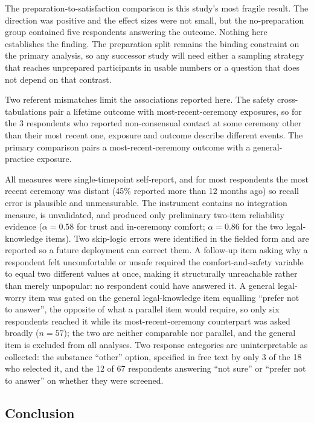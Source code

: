 \documentclass[12pt]{article}
\begin{document}
The preparation-to-satisfaction comparison is this study's most fragile result. The direction was positive
and the effect sizes were not small, but the no-preparation group contained five respondents answering the
outcome. Nothing here establishes the finding. The preparation split remains the binding constraint on the
primary analysis, so any successor study will need either a sampling strategy that reaches unprepared
participants in usable numbers or a question that does not depend on that contrast.

Two referent mismatches limit the associations reported here. The safety cross-tabulations pair a lifetime
outcome with most-recent-ceremony exposures, so for the 3 respondents who reported non-consensual contact at
some ceremony other than their most recent one, exposure and outcome describe different events. The primary
comparison pairs a most-recent-ceremony outcome with a general-practice exposure.

All measures were single-timepoint self-report, and for most respondents the most recent ceremony was
distant (45\% reported more than 12 months ago) so recall error is plausible and unmeasurable. The
instrument contains no integration measure, is unvalidated, and produced only preliminary two-item
reliability evidence ($\alpha=0.58$ for trust and in-ceremony comfort; $\alpha=0.86$ for the two
legal-knowledge items). Two skip-logic errors were identified in the fielded form and are reported so a
future deployment can correct them. A follow-up item asking why a respondent felt uncomfortable or unsafe
required the comfort-and-safety variable to equal two different values at once, making it structurally
unreachable rather than merely unpopular: no respondent could have answered it. A general legal-worry item
was gated on the general legal-knowledge item equalling ``prefer not to answer'', the opposite of what a
parallel item would require, so only six respondents reached it while its most-recent-ceremony counterpart
was asked broadly ($n=57$); the two are neither comparable nor parallel, and the general item is excluded
from all analyses. Two
response categories are uninterpretable as collected: the substance ``other'' option, specified in free text
by only 3 of the 18 who selected it, and the 12 of 67 respondents answering ``not sure'' or ``prefer not to
answer'' on whether they were screened.

\subsection{Conclusion}
\end{document}
